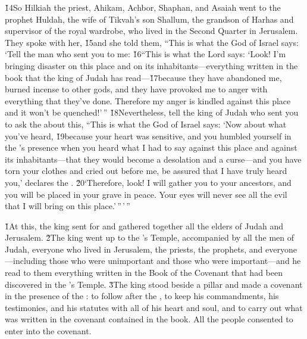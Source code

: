 \v{14}So Hilkiah the priest, Ahikam, Achbor, Shaphan, and Asaiah went to the prophet Huldah, the wife of Tikvah's son Shallum, the grandson of Harhas and supervisor of the royal wardrobe, who lived in the Second Quarter in Jerusalem. They spoke with her, \v{15}and she told them, ``This is what the  God of Israel says: `Tell the man who sent you to me: \v{16}``This is what the Lord says: `Look! I'm bringing disaster on this place and on its inhabitants---everything written in the book that the king of Judah has read---\v{17}because they have abandoned me, burned incense to other gods, and they have provoked me to anger with everything that they've done. Therefore my anger is kindled against this place and it won't be quenched!'\,'' \v{18}Nevertheless, tell the king of Judah who sent you to ask the  about this, ``This is what the  God of Israel says: `Now about what you've heard, \v{19}because your heart was sensitive, and you humbled yourself in the 's presence when you heard what I had to say against this place and against its inhabitants---that they would become a desolation and a curse---and you have torn your clothes and cried out before me, be assured that I have truly heard you,' declares the . \v{20}`Therefore, look! I will gather you to your ancestors, and you will be placed in your grave in peace. Your eyes will never see all the evil that I will bring on this place.'\,''\,'\,''

\v{1}At this, the king sent for and gathered together all the elders of Judah and Jerusalem. \v{2}The king went up to the 's Temple, accompanied by all the men of Judah, everyone who lived in Jerusalem, the priests, the prophets, and everyone---including those who were unimportant and those who were important---and he read to them everything written in the Book of the Covenant that had been discovered in the 's Temple. \v{3}The king stood beside a pillar and made a covenant in the presence of the : to follow after the , to keep his commandments, his testimonies, and his statutes with all of his heart and soul, and to carry out what was written in the covenant contained in the book. All the people consented to enter into the covenant.


